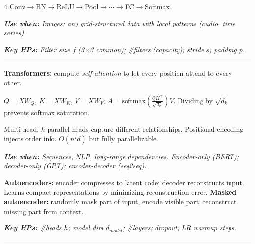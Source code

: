 \documentclass[6.5pt,landscape]{article}
\newcommand{\rl}{\vspace{-1.5pt}\par\noindent\rule{\columnwidth}{0.15pt}\par\vspace{-1pt}}
\newcommand{\sectionrule}{\vspace{-1pt}\par\noindent\rule{\columnwidth}{0.4pt}\par\vspace{-2pt}}
\newcommand{\use}[1]{\textit{\textbf{Use when:} #1}}
\newcommand{\hp}[1]{\textit{\textbf{Key HPs:} #1}}
\begin{document}
\begin{multicols*}{4}
Conv$\to$BN$\to$ReLU$\to$Pool$\to\cdots\to$FC$\to$Softmax.\par
\use{Images; any grid-structured data with local patterns (audio, time series).}\par
\hp{Filter size $f$ (3$\times$3 common); \#filters (capacity); stride $s$; padding $p$.}\par
\rl
\noindent\textbf{Transformers:} compute \emph{self-attention} to let every position attend to every other.\par
$Q=XW_Q$, $K=XW_K$, $V=XW_V$; $A=\text{softmax}\!\left(\tfrac{QK^\top}{\sqrt{d_k}}\right)V$. Dividing by $\sqrt{d_k}$ prevents softmax saturation.\par
Multi-head: $h$ parallel heads capture different relationships. Positional encoding injects order info. $O(n^2d)$ but fully parallelizable.\par
\use{Sequences, NLP, long-range dependencies. Encoder-only (BERT); decoder-only (GPT); encoder-decoder (seq2seq).}\par
\textbf{Autoencoders:} encoder compresses to latent code; decoder reconstructs input. Learns compact representations by minimizing reconstruction error. \textbf{Masked autoencoder:} randomly mask part of input, encode visible part, reconstruct missing part from context.\par
\hp{\#heads $h$; model dim $d_{model}$; \#layers; dropout; LR warmup steps.}\par
\sectionrule

\end{multicols*}
\end{document}
